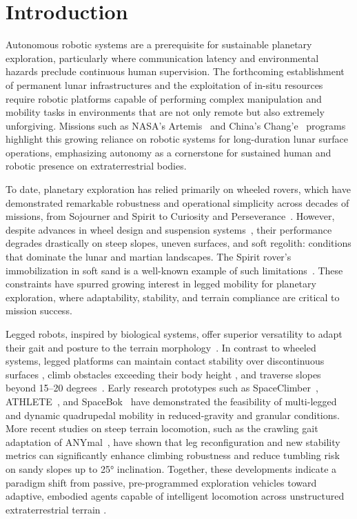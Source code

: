 \section{Introduction} \label{sec:intro}

Autonomous robotic systems are a prerequisite for sustainable planetary exploration, particularly where communication latency and environmental hazards preclude continuous human supervision. The forthcoming establishment of permanent lunar infrastructures and the exploitation of in-situ resources require robotic platforms capable of performing complex manipulation and mobility tasks in environments that are not only remote but also extremely unforgiving. Missions such as NASA’s Artemis~\citep{nasa_artemis_2025} and China’s Chang’e~\citep{JIA2018207} programs highlight this growing reliance on robotic systems for long-duration lunar surface operations, emphasizing autonomy as a cornerstone for sustained human and robotic presence on extraterrestrial bodies.

To date, planetary exploration has relied primarily on wheeled rovers, which have demonstrated remarkable robustness and operational simplicity across decades of missions, from Sojourner and Spirit to Curiosity and Perseverance~\citep{mars-rovers}. However, despite advances in wheel design and suspension systems~\citep{Johnson2015, Zheng2018}, their performance degrades drastically on steep slopes, uneven surfaces, and soft regolith: conditions that dominate the lunar and martian landscapes. The Spirit rover’s immobilization in soft sand is a well-known example of such limitations~\citep{spirit}. These constraints have spurred growing interest in legged mobility for planetary exploration, where adaptability, stability, and terrain compliance are critical to mission success.

Legged robots, inspired by biological systems, offer superior versatility to adapt their gait and posture to the terrain morphology~\citep{Kolvenbach2022}. In contrast to wheeled systems, legged platforms can maintain contact stability over discontinuous surfaces \citep{Chong2024RiskyTerrain}, climb obstacles exceeding their body height \citep{vogel2025robustladderclimbingquadrupedal}, and traverse slopes beyond 15--20 degrees~\citep{Valsecchi2023}. Early research prototypes such as SpaceClimber~\citep{5756948}, ATHLETE~\citep{Wilcox2007}, and SpaceBok~\citep{8794136} have demonstrated the feasibility of multi-legged and dynamic quadrupedal mobility in reduced-gravity and granular conditions. More recent studies on steep terrain locomotion, such as the crawling gait adaptation of ANYmal~\citep{Valsecchi2023}, have shown that leg reconfiguration and new stability metrics can significantly enhance climbing robustness and reduce tumbling risk on sandy slopes up to 25° inclination. Together, these developments indicate a paradigm shift from passive, pre-programmed exploration vehicles toward adaptive, embodied agents capable of intelligent locomotion across unstructured extraterrestrial terrain \citep{Kolvenbach2024}.

